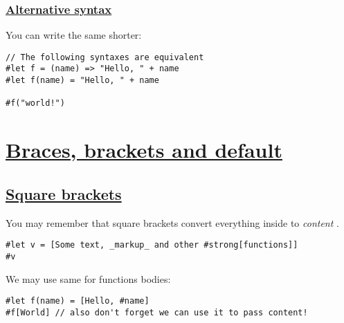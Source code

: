 \pandocbounded{}

\subsubsection{\texorpdfstring{\hyperref[alternative-syntax]{Alternative
syntax}}{Alternative syntax}}\label{alternative-syntax}

You can write the same shorter:

\begin{verbatim}
// The following syntaxes are equivalent
#let f = (name) => "Hello, " + name
#let f(name) = "Hello, " + name

#f("world!")
\end{verbatim}

\pandocbounded{}

\section{\texorpdfstring{\hyperref[braces-brackets-and-default]{Braces,
brackets and
default}}{Braces, brackets and default}}\label{braces-brackets-and-default}

\subsection{\texorpdfstring{\hyperref[square-brackets]{Square
brackets}}{Square brackets}}\label{square-brackets}

You may remember that square brackets convert everything inside to
\emph{content} .

\begin{verbatim}
#let v = [Some text, _markup_ and other #strong[functions]]
#v
\end{verbatim}

\pandocbounded{}

We may use same for functions bodies:

\begin{verbatim}
#let f(name) = [Hello, #name]
#f[World] // also don't forget we can use it to pass content!
\end{verbatim}

